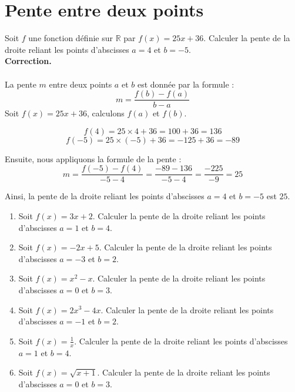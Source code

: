 \documentclass[11pt]{article}
\begin{document}
\section{Pente entre deux points}

\begin{exercice}
Soit \( f \) une fonction définie sur \( \mathbb{R} \) par \( f(x) = 25x + 36 \). Calculer la pente de la droite reliant les points d'abscisses \( a = 4 \) et \( b = -5 \).\\
\textbf{Correction.}\\ \\
La pente \( m \) entre deux points \( a \) et \( b \) est donnée par la formule :
\[
m = \frac{f(b) - f(a)}{b - a}
\]
Soit \( f(x) = 25x + 36 \),  calculons  \( f(a) \) et \( f(b) \).

\[
f(4) = 25 \times 4 + 36 = 100 + 36 = 136
\]
\[
f(-5) = 25 \times (-5) + 36 = -125 + 36 = -89
\]

Ensuite, nous appliquons la formule de la pente :
\[
m = \frac{f(-5) - f(4)}{-5 - 4} = \frac{-89 - 136}{-5 - 4} = \frac{-225}{-9} = 25
\]

Ainsi, la pente de la droite reliant les points d'abscisses \( a = 4 \) et \( b = -5 \) est \( 25 \).
\end{exercice}

\begin{exercice}
\begin{enumerate}
    \item Soit \( f(x) = 3x + 2 \). Calculer la pente de la droite reliant les points d'abscisses \( a = 1 \) et \( b = 4 \).
    
    \item Soit \( f(x) = -2x + 5 \). Calculer la pente de la droite reliant les points d'abscisses \( a = -3 \) et \( b = 2 \).
    
    \item Soit \( f(x) = x^2 - x \). Calculer la pente de la droite reliant les points d'abscisses \( a = 0 \) et \( b = 3 \).
    
    \item Soit \( f(x) = 2x^3 - 4x \). Calculer la pente de la droite reliant les points d'abscisses \( a = -1 \) et \( b = 2 \).
    
    \item Soit \( f(x) = \frac{1}{x} \). Calculer la pente de la droite reliant les points d'abscisses \( a = 1 \) et \( b = 4 \).
    
    \item Soit \( f(x) = \sqrt{x+1} \). Calculer la pente de la droite reliant les points d'abscisses \( a = 0 \) et \( b = 3 \).
\end{enumerate}

\end{exercice}
\end{document}

